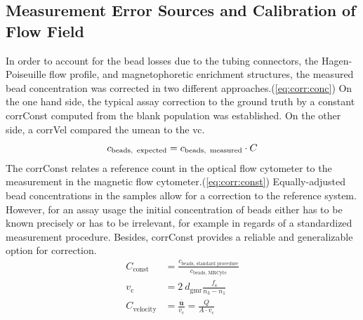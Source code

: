 \clearpage
\subsection{Measurement Error Sources and Calibration of Flow Field}
\label{sec:res:Correction}
In order to account for the bead losses due to the tubing connectors, the Hagen-Poiseuille flow profile, and magnetophoretic enrichment structures, the measured bead concentration was corrected in two different approaches.(\cref{eq:corr:conc}) On the one hand side, the typical assay correction to the ground truth by a constant \gls{corrConst} computed from the blank population was established. On the other side, a \gls{corrVel} compared the \acrfull{umean} to the \gls{vc}.
\begin{equation}	
	c_\text{beads,\, expected} = c_\text{beads,\, measured}  \cdot C \label{eq:corr:conc}
\end{equation}
The \gls{corrConst} relates a reference count in the optical flow cytometer to the measurement in the magnetic flow cytometer.(\cref{eq:corr:const}) Equally-adjusted bead concentrations in the samples allow for a correction to the reference system. However, for an assay usage the initial concentration of beads either has to be known precisely or has to be irrelevant, for example in regards of a standardized measurement procedure. Besides, \gls{corrConst} provides a reliable and generalizable option for correction. 
\begin{align}
	C_\text{const} &= \frac{c_\text{beads, standard procedure}}{c_\text{beads, MRCyte}} \label{eq:corr:const}\\
	v_\text{c} &= 2\ d_\text{gmr} \frac{f_\text{s}}{n_\text{3}-n_\text{1}} \label{eq:v:c} \\
	C_\text{velocity} &= \frac{\overline{\mathbf{u}}}{v_\text{c}} = \frac{Q}{A \cdot v_\text{c}} \label{eq:corr:vel} 
\end{align}
